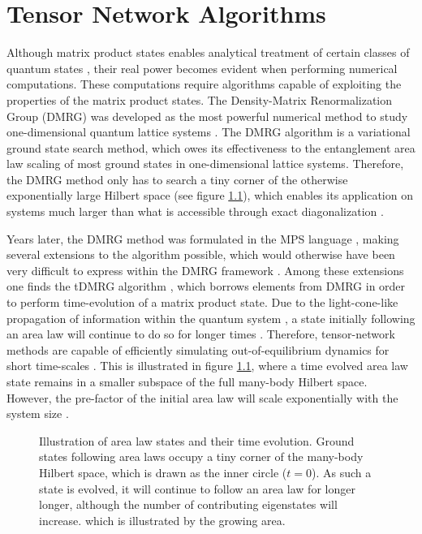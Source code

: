 \chapter{Tensor Network Algorithms}
Although matrix product states enables analytical treatment of certain classes of quantum states \cite{Baxter1968,Affleck1987}, their real power becomes evident when performing numerical computations. These computations require algorithms capable of exploiting the properties of the matrix product states. The Density-Matrix Renormalization Group (DMRG) was developed as the most powerful numerical method to study one-dimensional quantum lattice systems \cite{White1992,White1993}. The DMRG algorithm is a variational ground state search method, which owes its effectiveness to the entanglement area law scaling of most ground states in one-dimensional lattice systems. Therefore, the DMRG method only has to search a tiny corner of the otherwise exponentially large Hilbert space (see figure \ref{fig:HilbertSpace}), which enables its application on systems much larger than what is accessible through exact diagonalization \cite{Cramer}.

Years later, the DMRG method was formulated in the MPS language \cite{Ostlund1995, Dukelsky1998}, making several extensions to the algorithm possible, which would otherwise have been very difficult to express within the DMRG framework \cite{schollwock}. Among these extensions one finds the tDMRG algorithm \cite{Vidal2003,Vidal2004,Daley2004}, which borrows elements from DMRG in order to perform time-evolution of a matrix product state.
Due to the light-cone-like propagation of information within the quantum system \cite{Lauchli2008,Bravyi2006}, a state initially following an area law will continue to do so for longer times \cite{Bravyi2006,Eisert2006}.  Therefore, tensor-network methods are capable of efficiently simulating out-of-equilibrium dynamics for short time-scales \cite{Eisert2015}.
This is illustrated in figure \ref{fig:HilbertSpace}, where a time evolved area law state remains in a smaller subspace of the full many-body Hilbert space. However, the pre-factor of the initial area law will scale exponentially with the system size \cite{Schuch2008}.
\begin{figure}[h!]
	\centering
	
	\caption{Illustration of area law states and their time evolution. Ground states following area laws occupy a tiny corner of the many-body Hilbert space, which is drawn as the inner circle ($t = 0$). As such a state is evolved, it will continue to follow an area law for longer longer, although the number of contributing eigenstates will increase. which is illustrated by the growing area. }
	\label{fig:HilbertSpace}
\end{figure}


